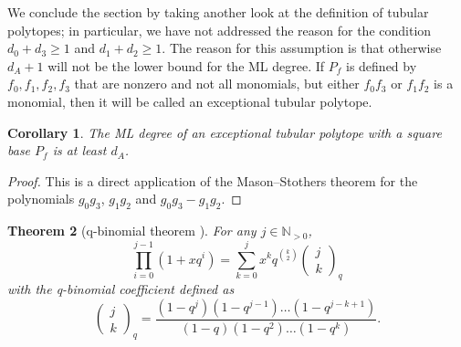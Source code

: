 \documentclass[12pt,reqno]{amsart}   	%
\theoremstyle{plain}
\newtheorem{theorem}{Theorem}[section]
\newtheorem{corollary}[theorem]{Corollary}
\theoremstyle{definition}
\theoremstyle{remark}
\begin{document}
We conclude the section by taking another look at the definition of tubular polytopes; in particular, we have not addressed the reason for the condition $d_0+d_3\geq 1$ and $d_1+d_2\geq 1$. The reason for this assumption is that otherwise $d_A+1$ will not be the lower bound for the ML degree.  If $P_f$ is defined by $f_0,f_1,f_2,f_3$ that are nonzero and not all monomials, but either $f_0f_3$ or $f_1f_2$ is a monomial, then it will be called an exceptional tubular polytope. 

\begin{corollary}
    The ML degree of an exceptional tubular polytope with a square base $P_f$ is at least $d_A$.
\end{corollary}
\begin{proof}
    This is a direct application of the Mason--Stothers theorem for the polynomials $g_0g_3$, $g_1g_2$ and $g_0g_3-g_1g_2$.
\end{proof}

\begin{theorem}[{q-binomial theorem \cite[Eq.~(1.87), p.~74]{stanleyEC1}}]
    For any $j \in \mathbb{N} _{>0}$,
    \[
        \prod_{i=0}^{j-1} (1+xq^i) = \sum_{k=0}^j x^k q^{\binom{k}{2}}
            \begin{pmatrix}
                j \\ k
            \end{pmatrix}_{q}
    \]
    with the q-binomial coefficient defined as
    \[
        \begin{pmatrix}
            j \\ k
        \end{pmatrix}_q
        = \frac{(1-q^j)(1-q^{j-1})\hdots(1-q^{j-k+1})}{(1-q)(1-q^2)\hdots(1-q^k)}.
    \]
\end{theorem}
\end{document}
